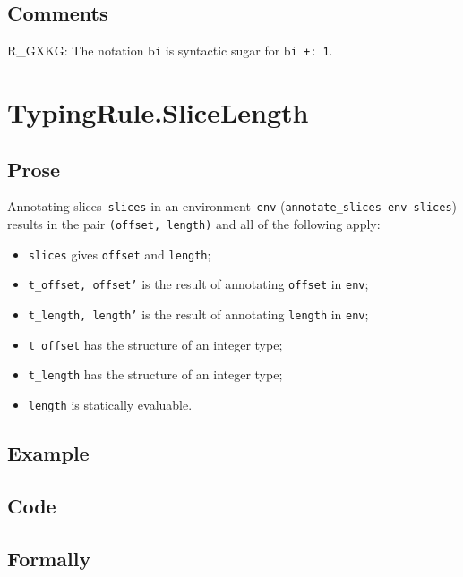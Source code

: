 \documentclass{book}
\begin{document}
\subsection{Comments}
    R\_GXKG: The notation b\texttt{i} is syntactic sugar for b\texttt{i +: 1}.

\section{TypingRule.SliceLength \label{sec:TypingRule.SliceLength}}

  \subsection{Prose}
   Annotating slices~\texttt{slices} in an environment~\texttt{env}
(\texttt{annotate\_slices env slices}) results in the pair \texttt{(offset,
length)} and all of the following apply:
   \begin{itemize}
   \item \texttt{slices} gives \texttt{offset} and \texttt{length}; 
   \item \texttt{t\_offset, offset'} is the result of annotating \texttt{offset} in \texttt{env};
   \item \texttt{t\_length, length'} is the result of annotating \texttt{length} in \texttt{env};
   \item \texttt{t\_offset} has the structure of an integer type;
   \item \texttt{t\_length} has the structure of an integer type;
   \item \texttt{length} is statically evaluable.
   \end{itemize}

  \subsection{Example}

  \subsection{Code}

\begin{emptyformal}
    \subsection{Formally}
\end{emptyformal}
\end{document}
